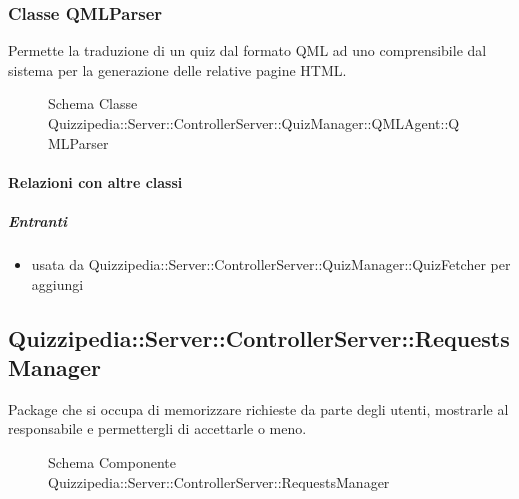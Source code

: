 \subsubsection{Classe QMLParser}
Permette la traduzione di un quiz dal formato QML ad uno comprensibile dal sistema per la generazione delle relative pagine HTML.
\begin{figure}[H]
\centering
\noindent{}
\caption[Schema Classe QMLParser]{Schema Classe Quizzipedia::Server::ControllerServer::QuizManager::QMLAgent::QMLParser}
\end{figure}
\paragraph{Relazioni con altre classi}
\subparagraph{Entranti}
\begin{itemize}
\item usata da Quizzipedia::Server::ControllerServer::QuizManager::QuizFetcher per aggiungi
\end{itemize}
\subsection{Quizzipedia::Server::ControllerServer::RequestsManager}
Package che si occupa di memorizzare richieste da parte degli utenti, mostrarle al responsabile e permettergli di accettarle o meno.
\begin{figure}[H]
\centering
\noindent{}
\caption[Schema Componente Quizzipedia::Server::ControllerServer::RequestsManager]{Schema Componente Quizzipedia::Server::ControllerServer::RequestsManager}
\end{figure}
